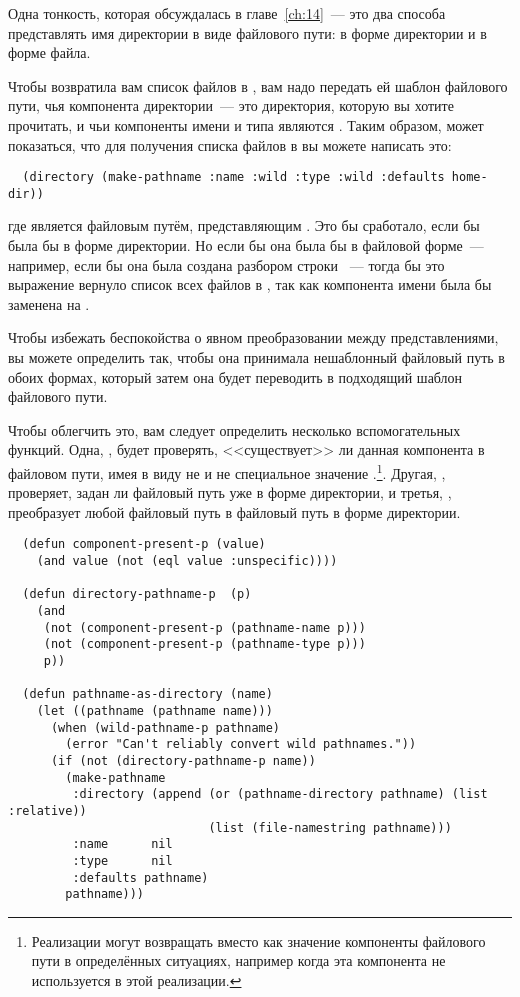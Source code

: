 Одна тонкость, которая обсуждалась в главе~\ref{ch:14}~--- это два способа представлять
имя директории в виде файлового пути: в форме директории и в форме файла.

Чтобы  возвратила вам список файлов в , вам надо
передать ей шаблон файлового пути, чья компонента директории~--- это директория, которую
вы хотите прочитать, и чьи компоненты имени и типа являются . Таким образом,
может показаться, что для получения списка файлов в  вы можете написать
это:

\begin{lstlisting}
  (directory (make-pathname :name :wild :type :wild :defaults home-dir))
\end{lstlisting}

\noindent{}где  является файловым путём, представляющим . Это бы
сработало, если бы  была бы в форме директории. Но если бы она была бы в
файловой форме~--- например, если бы она была создана разбором строки
~--- тогда бы это выражение вернуло список всех файлов в
, так как компонента имени  была бы заменена на
.

Чтобы избежать беспокойства о явном преобразовании между представлениями, вы можете
определить  так, чтобы она принимала нешаблонный файловый путь в
обоих формах, который затем она будет переводить в подходящий шаблон файлового пути.

Чтобы облегчить это, вам следует определить несколько вспомогательных функций. Одна,
, будет проверять, <<существует>> ли данная компонента в файловом
пути, имея в виду не  и не специальное значение
.\footnote{Реализации могут возвращать  вместо
   как значение компоненты файлового пути в определённых ситуациях, например
  когда эта компонента не используется в этой реализации.}. Другая,
, проверяет, задан ли файловый путь уже в форме директории, и
третья, , преобразует любой файловый путь в файловый путь в
форме директории.

\begin{lstlisting}
  (defun component-present-p (value)
    (and value (not (eql value :unspecific))))

  (defun directory-pathname-p  (p)
    (and
     (not (component-present-p (pathname-name p)))
     (not (component-present-p (pathname-type p)))
     p))

  (defun pathname-as-directory (name)
    (let ((pathname (pathname name)))
      (when (wild-pathname-p pathname)
        (error "Can't reliably convert wild pathnames."))
      (if (not (directory-pathname-p name))
        (make-pathname
         :directory (append (or (pathname-directory pathname) (list :relative))
                            (list (file-namestring pathname)))
         :name      nil
         :type      nil
         :defaults pathname)
        pathname)))
\end{lstlisting}

